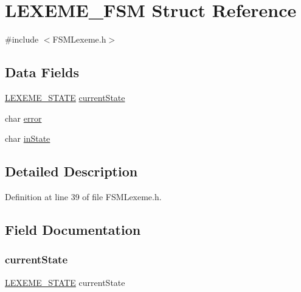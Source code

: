 \hypertarget{struct_l_e_x_e_m_e___f_s_m}{}\section{L\+E\+X\+E\+M\+E\+\_\+\+F\+SM Struct Reference}
\label{struct_l_e_x_e_m_e___f_s_m}


{\ttfamily \#include $<$F\+S\+M\+Lexeme.\+h$>$}

\subsection*{Data Fields}
\begin{DoxyCompactItemize}
\item 
\mbox{\hyperlink{_f_s_m_lexeme_8h_a5d966dc44e04ff2eef3b33046a1e67ad}{L\+E\+X\+E\+M\+E\+\_\+\+S\+T\+A\+TE}} \mbox{\hyperlink{struct_l_e_x_e_m_e___f_s_m_ade9fb34a16a9abdcf86c624a4f3550ab}{current\+State}}
\item 
char \mbox{\hyperlink{struct_l_e_x_e_m_e___f_s_m_a1b39a1a9b9888563c380903bcba6ecf4}{error}}
\item 
char \mbox{\hyperlink{struct_l_e_x_e_m_e___f_s_m_a3c3253f225f622698d3c4b407d0b262b}{in\+State}}
\end{DoxyCompactItemize}


\subsection{Detailed Description}


Definition at line 39 of file F\+S\+M\+Lexeme.\+h.



\subsection{Field Documentation}
\mbox{\label{struct_l_e_x_e_m_e___f_s_m_ade9fb34a16a9abdcf86c624a4f3550ab}} 
\subsubsection{\texorpdfstring{current\+State}{currentState}}
{\footnotesize\ttfamily \mbox{\hyperlink{_f_s_m_lexeme_8h_a5d966dc44e04ff2eef3b33046a1e67ad}{L\+E\+X\+E\+M\+E\+\_\+\+S\+T\+A\+TE}} current\+State}



